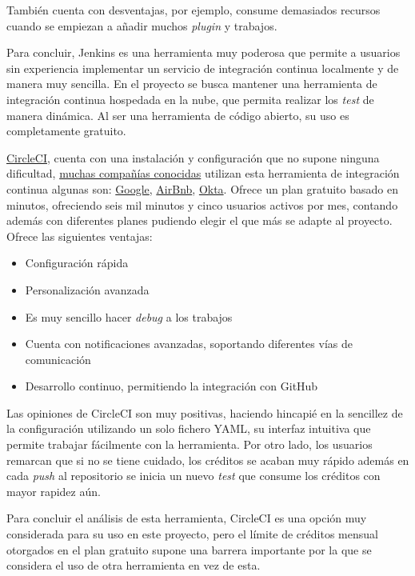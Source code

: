 También cuenta con desventajas, por ejemplo, consume demasiados recursos cuando se empiezan a añadir muchos \emph{plugin} y trabajos.

Para concluir, Jenkins es una herramienta muy poderosa que permite a usuarios sin experiencia implementar un servicio de integración continua localmente y de manera muy sencilla. En el proyecto se busca mantener una herramienta de integración continua hospedada en la nube, que permita realizar los \emph{test} de manera dinámica. Al ser una herramienta de código abierto, su uso es completamente gratuito. 

\href{https://circleci.com/}{CircleCI}, cuenta con una instalación y configuración que no supone ninguna dificultad, \href{https://circleci.com/customers/}{muchas compañías conocidas} utilizan esta herramienta de integración continua algunas son: \href{https://www.google.com/}{Google}, \href{https://www.airbnb.es/}{AirBnb}, \href{https://www.okta.com/}{Okta}. Ofrece un plan gratuito basado en minutos, ofreciendo seis mil minutos y cinco usuarios activos por mes, contando además con diferentes planes pudiendo elegir el que más se adapte al proyecto. Ofrece las siguientes ventajas: \cite{polkhovskiy2016comparison}
\begin{itemize}
    \item Configuración rápida
    \item Personalización avanzada
    \item Es muy sencillo hacer \emph{debug} a los trabajos
    \item Cuenta con notificaciones avanzadas, soportando diferentes vías de comunicación
    \item Desarrollo continuo, permitiendo la integración con GitHub
\end{itemize}

Las opiniones de CircleCI son muy positivas, haciendo hincapié en la sencillez de la configuración utilizando un solo fichero YAML, su interfaz intuitiva que permite trabajar fácilmente con la herramienta. Por otro lado, los usuarios remarcan que si no se tiene cuidado, los créditos se acaban muy rápido además en cada \emph{push} al repositorio se inicia un nuevo \emph{test} que consume los créditos con mayor rapidez aún. \cite{CircleCI2023}

Para concluir el análisis de esta herramienta, CircleCI es una opción muy considerada para su uso en este proyecto, pero el límite de créditos mensual otorgados en el plan gratuito supone una barrera importante por la que se considera el uso de otra herramienta en vez de esta.

